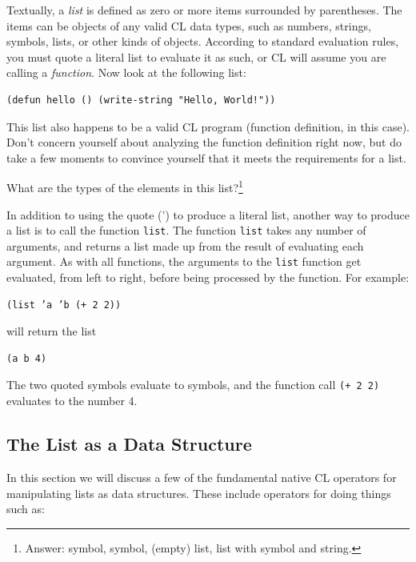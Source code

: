 \documentclass [11pt]{book}
\begin{document}
Textually, a \emph{list} is defined as zero or more items surrounded by
parentheses. The items can be objects of any valid CL data types, such
as numbers, strings, symbols, lists, or other kinds of
objects. According to standard evaluation rules, you must quote a
literal list to evaluate it as such, or CL will assume you are calling
a \emph{function}. Now look at the following list:

\begin{verbatim}(defun hello () (write-string "Hello, World!"))
\end{verbatim}This list also happens to be a valid CL program (function definition,
in this case). Don't concern yourself about analyzing the function definition
right now, but do take a few moments to convince yourself that it
meets the requirements for a list.



What are the types of the elements in this list?\footnote{Answer: symbol, symbol, (empty) list, list with symbol and string.}



In addition to using the quote (') to produce a literal list, another
way to produce a list is to call the function \texttt{list}. The function \texttt{list} takes any number of arguments, and returns a list made up
from the result of evaluating each argument. As with all functions,
the arguments to the \texttt{list} function get evaluated, from left to right, before being
processed by the function. For example:

\begin{verbatim}(list ’a ’b (+ 2 2))
\end{verbatim}will return the list

\begin{verbatim}(a b 4)
\end{verbatim}The two quoted symbols evaluate to symbols, and the function
call \texttt{(+ 2 2)} evaluates to the number 4.



\subsection{The List as a Data Structure}

\label{subsec:thelistasadatastructure}

In this section we will discuss a few of the fundamental native
CL operators for manipulating lists as data structures. These include
operators for doing things such as:
\end{document}

